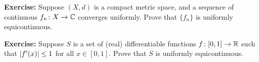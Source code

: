 \documentclass[10pt,aspectratio=169]{beamer}
\begin{document}
\begin{frame}
\textbf{Exercise:}
Suppose $(X,d)$ is a compact metric space,
and a sequence of continuous $f_n \colon X \to {\mathbb{C}}$
converges uniformly. Prove that $\{ f_n \}$ is uniformly equicontinuous.

\pause
\medskip

\textbf{Exercise:}
Suppose $S$ is a set of (real) differentiable functions $f \colon [0,1] \to {\mathbb{R}}$
such that $\lvert {f'(x)} \rvert \leq 1$ for all $x \in [0,1]$.
Prove that $S$ is uniformly equicontinuous.

\end{frame}
\end{document}
